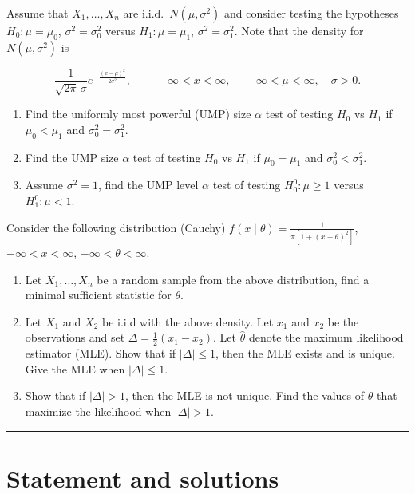 \documentclass[11pt,a4paper]{article}
\newcommand{\examstatement}[1]{%
  \par\addvspace{0.85em}%
  \noindent{\bfseries #1}\par\nobreak\addvspace{0.28em}%
}
\begin{document}
\examstatement{Problem 7. [15 pts.]}
Assume that \( X_1, \dots, X_n \) are i.i.d.\ \( N(\mu, \sigma^2) \) and consider testing the hypotheses \( H_0 : \mu = \mu_0 \), \( \sigma^2 = \sigma_0^2 \) versus \( H_1 : \mu = \mu_1 \), \( \sigma^2 = \sigma_1^2 \). Note that the density for \( N(\mu, \sigma^2) \) is

\[
\frac{1}{\sqrt{2\pi}\,\sigma} e^{-\frac{(x-\mu)^2}{2\sigma^2}}, \qquad -\infty < x < \infty,\quad -\infty < \mu < \infty,\quad \sigma > 0.
\]

\begin{enumerate}[label=(\alph*)]
    \item Find the uniformly most powerful (UMP) size \( \alpha \) test of testing \( H_0 \) vs \( H_1 \) if \( \mu_0 < \mu_1 \) and \( \sigma_0^2 = \sigma_1^2 \).
    \item Find the UMP size \( \alpha \) test of testing \( H_0 \) vs \( H_1 \) if \( \mu_0 = \mu_1 \) and \( \sigma_0^2 < \sigma_1^2 \).
    \item Assume \( \sigma^2 = 1 \), find the UMP level \( \alpha \) test of testing \( H_{0}^{0} : \mu \ge 1 \) versus \( H_{1}^{0} : \mu < 1 \).
\end{enumerate}

\examstatement{Problem 8. [15 pts.]}
Consider the following distribution (Cauchy) \( f(x \mid \theta) = \frac{1}{\pi[1+(x-\theta)^2]} \), \( -\infty < x < \infty \), \( -\infty < \theta < \infty \).
\begin{enumerate}[label=(\alph*)]
    \item Let \( X_1, \dots, X_n \) be a random sample from the above distribution, find a minimal sufficient statistic for \( \theta \).
    \item Let \( X_1 \) and \( X_2 \) be i.i.d with the above density. Let \( x_1 \) and \( x_2 \) be the observations and set \( \Delta = \frac{1}{2}(x_1 - x_2) \). Let \( \hat{\theta} \) denote the maximum likelihood estimator (MLE). Show that if \( |\Delta| \le 1 \), then the MLE exists and is unique. Give the MLE when \( |\Delta| \le 1 \).
    \item Show that if \( |\Delta| > 1 \), then the MLE is not unique. Find the values of \( \theta \) that maximize the likelihood when \( |\Delta| > 1 \).
\end{enumerate}

\noindent\rule{\linewidth}{0.4pt}

\section{Statement and solutions}
\end{document}
